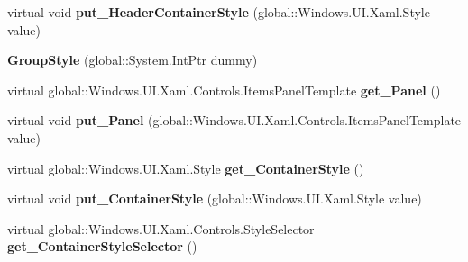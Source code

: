 \begin{DoxyCompactItemize}
\item 
\mbox{\label{class_windows_1_1_u_i_1_1_xaml_1_1_controls_1_1_group_style_aab18a3e263942f9bedd80679e89e0fba}} 
virtual void {\bfseries put\+\_\+\+Header\+Container\+Style} (global\+::\+Windows.\+U\+I.\+Xaml.\+Style value)
\item 
\mbox{\label{class_windows_1_1_u_i_1_1_xaml_1_1_controls_1_1_group_style_a48ddd6c81df5d4b20a17360153322649}} 
{\bfseries Group\+Style} (global\+::\+System.\+Int\+Ptr dummy)
\item 
\mbox{\label{class_windows_1_1_u_i_1_1_xaml_1_1_controls_1_1_group_style_a3c268ef18089368deaadd594eb77b93f}} 
virtual global\+::\+Windows.\+U\+I.\+Xaml.\+Controls.\+Items\+Panel\+Template {\bfseries get\+\_\+\+Panel} ()
\item 
\mbox{\label{class_windows_1_1_u_i_1_1_xaml_1_1_controls_1_1_group_style_abdff045e22bd9e3c822ebdbb721ca0cd}} 
virtual void {\bfseries put\+\_\+\+Panel} (global\+::\+Windows.\+U\+I.\+Xaml.\+Controls.\+Items\+Panel\+Template value)
\item 
\mbox{\label{class_windows_1_1_u_i_1_1_xaml_1_1_controls_1_1_group_style_aca3b627e4f154a3c71dfb861be9a9d70}} 
virtual global\+::\+Windows.\+U\+I.\+Xaml.\+Style {\bfseries get\+\_\+\+Container\+Style} ()
\item 
\mbox{\label{class_windows_1_1_u_i_1_1_xaml_1_1_controls_1_1_group_style_abb8477a846bdaf75ee930b67c2f7d88d}} 
virtual void {\bfseries put\+\_\+\+Container\+Style} (global\+::\+Windows.\+U\+I.\+Xaml.\+Style value)
\item 
\mbox{\label{class_windows_1_1_u_i_1_1_xaml_1_1_controls_1_1_group_style_a2de61fd35bfccb41a006bc9635ed88ec}} 
virtual global\+::\+Windows.\+U\+I.\+Xaml.\+Controls.\+Style\+Selector {\bfseries get\+\_\+\+Container\+Style\+Selector} ()
\item 

\end{DoxyCompactItemize}
